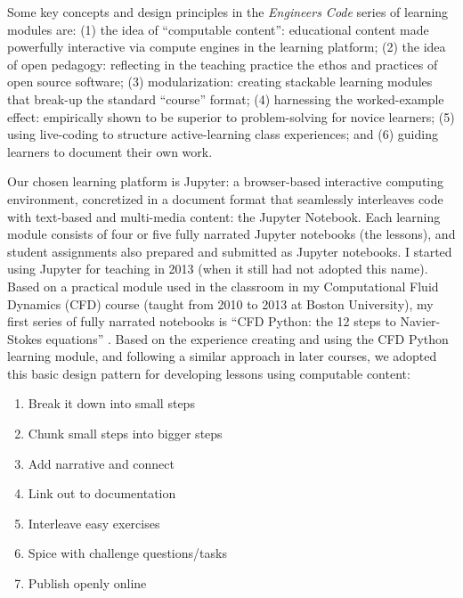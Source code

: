 \documentclass[10pt,journal,compsoc]{IEEEtran}
\begin{document}
Some key concepts and design principles in the \emph{Engineers Code} series of learning modules are: 
(1) the idea of ``computable content'': educational content made powerfully interactive via compute engines in the learning platform; 
(2) the idea of open pedagogy: reflecting in the teaching practice the ethos and practices of open source software; 
(3) modularization: creating stackable learning modules that break-up the standard ``course'' format; 
(4) harnessing the worked-example effect: empirically shown to be superior to problem-solving for novice learners; 
(5) using live-coding to structure active-learning class experiences; and
(6) guiding learners to document their own work. 

Our chosen learning platform is Jupyter: a browser-based interactive computing environment, concretized in a document format that seamlessly interleaves code with text-based and multi-media content: the Jupyter Notebook. 
Each learning module consists of four or five fully narrated Jupyter notebooks (the lessons), and student assignments also prepared and submitted as Jupyter notebooks.
I started using Jupyter for teaching in 2013 (when it still had not adopted this name). 
Based on a practical module used in the classroom in my Computational Fluid Dynamics (CFD) course (taught from 2010 to 2013 at Boston University), my first series of fully narrated notebooks is ``CFD Python: the 12 steps to Navier-Stokes equations'' \cite{BarbaForsyth2018}. 
Based on the experience creating and using the CFD Python learning module, and following a similar approach in later courses, we adopted this basic design pattern for developing lessons using computable content:

\begin{enumerate}
\item Break it down into small steps
\item Chunk small steps into bigger steps
\item Add narrative and connect
\item Link out to documentation
\item Interleave easy exercises
\item Spice with challenge questions/tasks
\item Publish openly online
\end{enumerate}
\end{document}
